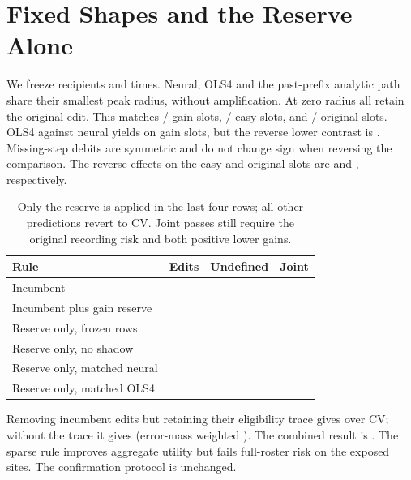 \section{Fixed Shapes and the Reserve Alone}

We freeze recipients and times. Neural, OLS4 and the
past-prefix analytic path share their smallest peak radius,
without amplification. At zero radius all retain the original
edit. This matches \ShapeSlotGainMatched{}/\ShapeSlotGainSlots{} gain slots,
\ShapeSlotEasyMatched{}/\ShapeSlotEasySlots{} easy slots, and
\ShapeSlotIncumbentMatched{}/\ShapeSlotIncumbentSlots{} original slots.
OLS4 against neural yields \ShapeSlotGainForward{} on gain
slots, but the reverse lower contrast is \ShapeSlotGainReverse{}.
Missing-step debits are symmetric and do not change sign
when reversing the comparison. The reverse effects on the
easy and original slots are \ShapeSlotEasyReverse{} and
\ShapeSlotIncumbentReverse{}, respectively.

\begin{table}[h]
\centering
\caption{Only the reserve is applied in the last four rows;
all other predictions revert to CV. Joint passes still require
the original recording risk and both positive lower gains.}
\small
\begin{tabular}{lrrr}
\toprule
Rule & Edits & Undefined & Joint \\
\midrule
Incumbent & \ShapeSlotOriginalEdits{} & \ShapeSlotOriginalUndefined{} & \ShapeSlotOriginalPass{} \\
Incumbent plus gain reserve & \ShapeSlotFullEdits{} & \ShapeSlotFullUndefined{} & \ShapeSlotFullPass{} \\
Reserve only, frozen rows & \ShapeSlotOnlyEdits{} & \ShapeSlotOnlyUndefined{} & \ShapeSlotOnlyPass{} \\
Reserve only, no shadow & \ShapeSlotSimpleEdits{} & \ShapeSlotSimpleUndefined{} & \ShapeSlotSimplePass{} \\
Reserve only, matched neural & \ShapeSlotNeuralEdits{} & \ShapeSlotNeuralUndefined{} & \ShapeSlotNeuralPass{} \\
Reserve only, matched OLS4 & \ShapeSlotOLSEdits{} & \ShapeSlotOLSUndefined{} & \ShapeSlotOLSPass{} \\
\bottomrule
\end{tabular}
\end{table}

Removing incumbent edits but retaining their eligibility trace
gives \ShapeSlotSingle{} over CV; without the trace it gives
\ShapeSlotFree{} (error-mass weighted \ShapeSlotWeighted{}).
The combined result is \ShapeSlotCombined{}. The sparse
rule improves aggregate utility but fails full-roster risk
on the exposed sites. The confirmation protocol is unchanged.
